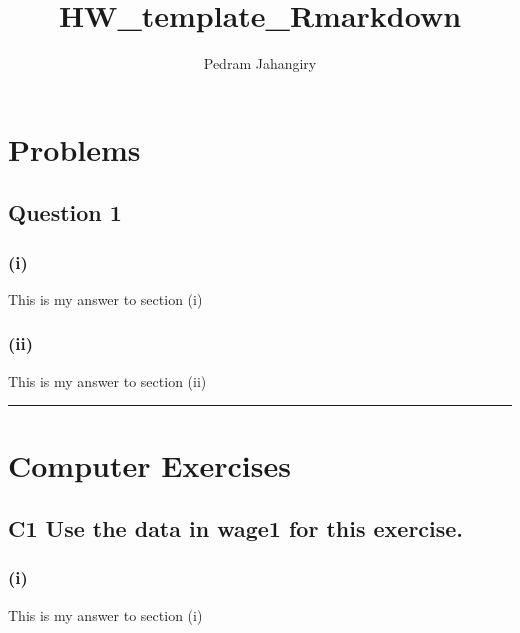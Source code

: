 \documentclass[
]{article}
\title{HW\_template\_Rmarkdown}
\author{Pedram Jahangiry}
\date{}
\begin{document}
\maketitle

\tableofcontents

\newpage

\hypertarget{problems}{%
\section{Problems}\label{problems}}

\hypertarget{question-1}{%
\subsection{Question 1}\label{question-1}}

\hypertarget{i}{%
\subsubsection{(i)}\label{i}}

This is my answer to section (i)

\hypertarget{ii}{%
\subsubsection{(ii)}\label{ii}}

This is my answer to section (ii)

\begin{center}\rule{0.5\linewidth}{0.5pt}\end{center}

\hypertarget{computer-exercises}{%
\section{Computer Exercises}\label{computer-exercises}}

\hypertarget{c1-use-the-data-in-wage1-for-this-exercise.}{%
\subsection{C1 Use the data in wage1 for this
exercise.}\label{c1-use-the-data-in-wage1-for-this-exercise.}}

\hypertarget{i-1}{%
\subsubsection{(i)}\label{i-1}}

This is my answer to section (i)
\end{document}

